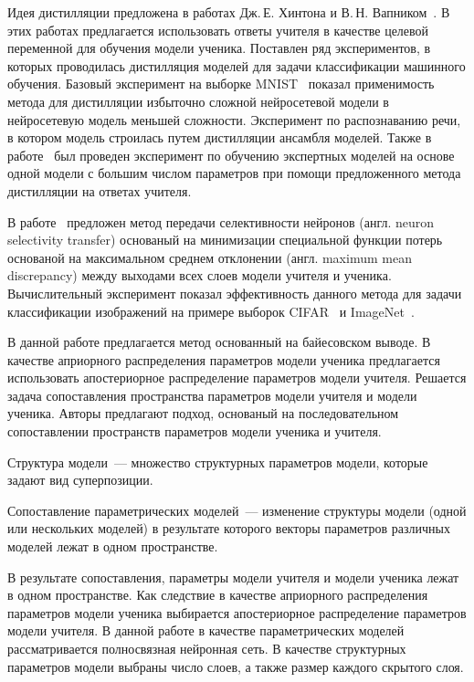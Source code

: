 \documentclass[12pt]{a&t}
\begin{document}
Идея дистилляции предложена в работах Дж.\,Е. Хинтона и В.\,Н. Вапником~\cite{Hinton2015, Vapnik2015, Lopez2016}. В этих работах предлагается использовать ответы учителя в качестве целевой переменной для обучения модели ученика. Поставлен ряд экспериментов, в которых проводилась дистилляция моделей для задачи классификации машинного обучения. Базовый эксперимент на выборке MNIST~\cite{mnist} показал применимость метода для дистилляции избыточно сложной нейросетевой модели в нейросетевую модель меньшей сложности. Эксперимент по распознаванию речи, в котором модель строилась путем дистилляции ансамбля моделей. Также в работе~\cite{Hinton2015} был проведен эксперимент по обучению экспертных моделей на основе одной модели с большим числом параметров при помощи предложенного метода дистилляции на ответах учителя.

В работе~\cite{Zehao2017} предложен метод передачи селективности нейронов (англ. neuron selectivity transfer) основаный на минимизации специальной функции потерь основаной на максимальном среднем отклонении (англ. maximum mean discrepancy) между выходами всех слоев модели учителя и ученика. Вычислительный эксперимент показал эффективность данного метода для задачи классификации изображений на примере выборок CIFAR~\cite{cifar10} и ImageNet~\cite{imagenet}.

В данной работе предлагается метод основанный на байесовском выводе.
В качестве априорного распределения параметров модели ученика предлагается использовать апостериорное распределение параметров модели учителя.
Решается задача сопоставления пространства параметров модели учителя и модели ученика.
Авторы предлагают подход, основаный на последовательном сопоставлении пространств параметров модели ученика и учителя. 
\begin{definition}
\label{def:structure}
Структура модели~--- множество структурных параметров модели, которые задают вид суперпозиции.
\end{definition}
\begin{definition}
\label{def:sopos}
Сопоставление параметрических моделей~--- изменение структуры модели (одной или нескольких моделей) в результате которого векторы параметров различных моделей лежат в одном пространстве.
\end{definition}
В результате сопоставления, параметры модели учителя и модели ученика лежат в одном пространстве.
Как следствие в качестве априорного распределения параметров модели ученика выбирается апостериорное распределение параметров модели учителя.
В данной работе в качестве параметрических моделей рассматривается полносвязная нейронная сеть.
В качестве структурных параметров модели выбраны число слоев, а также размер каждого скрытого слоя.
\end{document}
